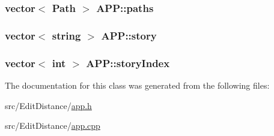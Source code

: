 \hypertarget{class_a_p_p_aa2aee15bbba3ab5ba5b6c9e120068a0e}{
\subsubsection[{paths}]{\setlength{\rightskip}{0pt plus 5cm}vector$<$ {\bf Path} $>$ A\+P\+P\+::paths\hspace{0.3cm}{\ttfamily [protected]}}}\label{class_a_p_p_aa2aee15bbba3ab5ba5b6c9e120068a0e}
\hypertarget{class_a_p_p_ac5841d717fc07ad656b743f86336b8a5}{
\subsubsection[{story}]{\setlength{\rightskip}{0pt plus 5cm}vector$<$ string $>$ A\+P\+P\+::story\hspace{0.3cm}{\ttfamily [protected]}}}\label{class_a_p_p_ac5841d717fc07ad656b743f86336b8a5}
\hypertarget{class_a_p_p_abe393707ad5d1aa537ddbb4428b84c32}{
\subsubsection[{story\+Index}]{\setlength{\rightskip}{0pt plus 5cm}vector$<$ int $>$ A\+P\+P\+::story\+Index\hspace{0.3cm}{\ttfamily [protected]}}}\label{class_a_p_p_abe393707ad5d1aa537ddbb4428b84c32}


The documentation for this class was generated from the following files\+:\begin{DoxyCompactItemize}
\item 
src/\+Edit\+Distance/\hyperlink{_edit_distance_2app_8h}{app.\+h}\item 
src/\+Edit\+Distance/\hyperlink{_edit_distance_2app_8cpp}{app.\+cpp}\end{DoxyCompactItemize}
